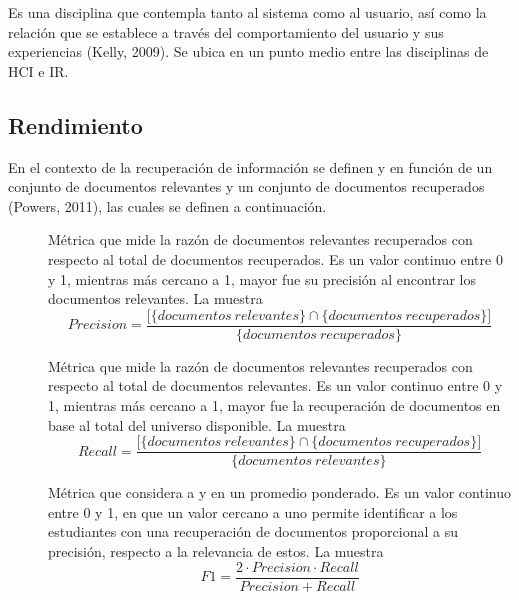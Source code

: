 Es una disciplina que contempla tanto al sistema como al usuario, así como la relación que se establece a través del comportamiento del usuario y sus experiencias (Kelly, 2009). Se ubica en un punto medio entre las disciplinas de HCI e IR.

\subsection{Rendimiento}
\label{subsec:rendimiento}
En el contexto de la recuperación de información se definen  y  en función de un conjunto de documentos relevantes y un conjunto de documentos recuperados (Powers, 2011), las cuales se definen a continuación.  

\begin{description}
	\item [] Métrica que mide la razón de documentos relevantes recuperados con 
respecto al total de documentos recuperados. Es un valor continuo entre 0 y 1, mientras más cercano a 1, mayor fue su precisión al encontrar los documentos relevantes. La  muestra
	\begin{equation}
	Precision = \frac{\big[\big\{documentos \ relevantes\big\} \cap \big\{documentos \ recuperados\big\}\big]}{\big\{documentos \ recuperados\big\}}
	\label{eq:precision}
	\end{equation}

	\item [] Métrica que mide la razón de documentos relevantes recuperados con 
respecto al total de documentos relevantes. Es un valor continuo entre 0 y 1, mientras más cercano a 1, mayor fue la recuperación de documentos en base al total del universo disponible. La  muestra
	\begin{equation}
	Recall = \frac{\big[\big\{documentos \ relevantes\big\} \cap \big\{documentos \ recuperados\big\}\big]}{\big\{documentos \ relevantes\big\}}
	\label{eq:recall}
	\end{equation}

	\item [] Métrica que considera a  y  en un promedio ponderado. Es un valor continuo entre 0 y 1, en que un valor cercano a uno permite identificar a los estudiantes con una recuperación de documentos proporcional a su precisión, respecto a la relevancia de estos. La  muestra   
	\begin{equation}
	F1 = \frac{2 \cdot Precision\cdot Recall}{Precision+ Recall}
	\label{eq:F1}
	\end{equation}
 

\end{description}
